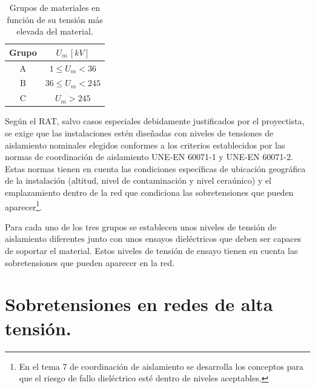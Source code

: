         \begin{table}[H]
            \centering
            \renewcommand{\arraystretch}{1.1}
            \begin{tabular}{cc}
                Grupo & $U_\textit{m}\,[\textit{kV}]$\\
                \hline
                A & $1 \leq U_\textit{m} < 36$\\
                B & $36 \leq U_\textit{m} < 245$\\
                C & $U_\textit{m} > 245$\\
            \end{tabular}
            \caption{Grupos de materiales en función de su tensión más elevada del material.}
            \label{tab:gruposTensiones}
        \end{table}
        
        Según el RAT, salvo casos especiales debidamente justificados por el proyectista, se exige que las instalaciones estén diseñadas con niveles de tensiones de aislamiento nominales elegidos conformes a los criterios establecidos por las normas de coordinación de aislamiento UNE-EN 60071-1 y UNE-EN 60071-2. Estas normas tienen en cuenta las condiciones específicas de ubicación geográfica de la instalación (altitud, nivel de contaminación y nivel ceraúnico) y el emplazamiento dentro de la red que condiciona las sobretensiones que pueden aparecer\footnote{En el tema 7 de coordinación de aislamiento se desarrolla los conceptos para que el riesgo de fallo dieléctrico esté dentro de niveles aceptables.}.\newline
        
        Para cada uno de los tres grupos se establecen unos niveles de tensión de aislamiento diferentes junto con unos ensayos dieléctricos que deben ser capaces de soportar el material. Estos niveles de tensión de ensayo tienen en cuenta las sobretensiones que pueden aparecer en la red.

    \section{Sobretensiones en redes de alta tensión.}
